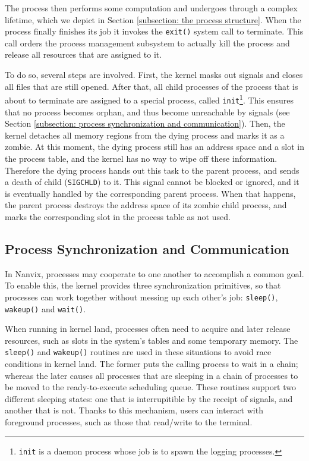 	The process then performs some computation and undergoes through
	a complex lifetime, which we depict in Section \ref{subsection:
	the process structure}. When the process finally finishes its
	job it invokes the \texttt{exit()} system call to terminate.
	This call orders the process management subsystem to actually
	kill the process and release all resources that are assigned to
	it.

	To do so, several steps are involved. First, the kernel masks
	out signals and closes all files that are still opened. After
	that, all child processes of the process that is about to
	terminate are assigned to a special process, called
	\texttt{init}\footnote{\texttt{init} is a daemon process whose
	job is to spawn the logging processes.}. This ensures that no
	process becomes orphan, and thus become unreachable by signals
	(see Section \ref{subsection: process synchronization and
	communication}). Then, the kernel detaches all memory regions
	from the dying process and marks it as a zombie. At this moment,
	the dying process still has an address space and a slot in the
	process table, and the kernel has no way to wipe off these
	information. Therefore the dying process hands out this task to
	the parent process, and sends a death of child
	(\texttt{SIGCHLD}) to it. This signal cannot be blocked or
	ignored, and it is eventually handled by the corresponding
	parent process. When that happens, the parent process destroys
	the address space of its zombie child process, and marks the
	corresponding slot in the process table as not used.

\subsection{Process Synchronization and Communication}
\label{subsection: process synchronization and communication}

	In Nanvix, processes may cooperate to one another to accomplish
	a common goal. To enable this, the kernel provides three
	synchronization primitives, so that processes can work together
	without messing up each other's job: \texttt{sleep()},
	\texttt{wakeup()} and \texttt{wait()}.

	When running in kernel land, processes often need to acquire and
	later release resources, such as slots in the system's tables
	and some temporary memory. The \texttt{sleep()} and
	\texttt{wakeup()} routines are used in these situations to avoid
	race conditions in kernel land. The former puts the calling
	process to wait in a chain; whereas the later causes all
	processes that are sleeping in a chain of processes to be moved
	to the ready-to-execute scheduling queue. These routines support
	two different sleeping states: one that is interrupitible by the
	receipt of signals, and another that is not. Thanks to this
	mechanism, users can interact with foreground processes, such as
	those that read/write to the terminal.

